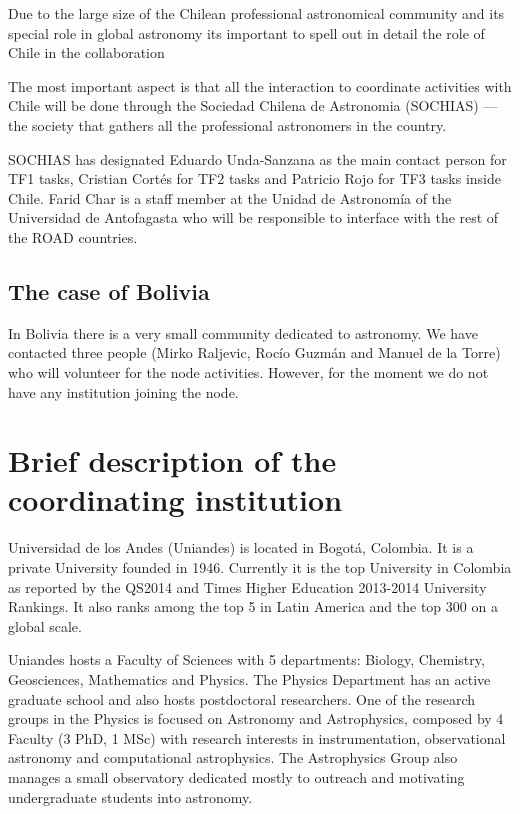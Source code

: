 \documentclass[12pt]{article}
\begin{document}
Due to the large size of the Chilean professional astronomical
community and its special role in global astronomy its important to
spell out in detail the role of Chile in the collaboration

The most important aspect is that all the interaction to coordinate
activities with Chile will be done through the Sociedad Chilena de
Astronomia (SOCHIAS) --- the society that gathers all the professional
astronomers in the country.

SOCHIAS has designated Eduardo Unda-Sanzana as the main contact
person for TF1 tasks, Cristian Cort\'es for TF2 tasks and Patricio
Rojo for TF3 tasks inside Chile. Farid Char is a staff member at the
Unidad de Astronomía of the Universidad de Antofagasta who will be
responsible to interface with the rest of the ROAD countries. 


\subsection*{The case of Bolivia}

In Bolivia there is a very small community dedicated to
astronomy. We have contacted three people (Mirko Raljevic, Roc\'io
Guzm\'an and Manuel de la Torre) who will volunteer for the node
activities. However, for the moment we do not have any institution
joining the node.

\appendixpage
\appendix

\section{Brief description of the coordinating institution}

Universidad de los Andes (Uniandes) is located in Bogotá, Colombia. It
is a private University founded in 1946. Currently it is the top
University in Colombia as reported by the QS2014 and Times
Higher Education 2013-2014 University Rankings. It also ranks among
the top 5 in Latin America and the top 300 on a global scale.    

Uniandes hosts a Faculty of Sciences with 5 departments: Biology,
Chemistry, Geosciences, Mathematics and Physics. The Physics
Department has an active graduate school and also hosts postdoctoral
researchers. One of the research groups in the Physics is focused on
Astronomy and Astrophysics, composed by 4 Faculty (3 PhD, 1 MSc) with
research interests in instrumentation, observational astronomy and
computational astrophysics. The Astrophysics Group also manages a
small observatory dedicated mostly to outreach and motivating
undergraduate students into astronomy. 
\end{document}
